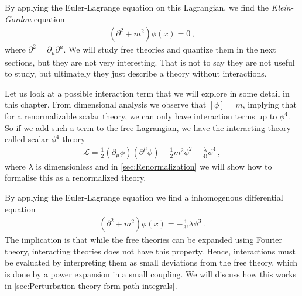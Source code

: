 By applying the Euler-Lagrange equation on this Lagrangian, we find the \emph{Klein-Gordon} equation
\begin{align}
    (\partial^{2}+m^{2})\phi(x)=0\,,
\end{align}  
where $\partial^{2}=\partial_{\mu}\partial^{\mu}$. We will study free theories and quantize them in the next sections, but they are not very interesting. That is not to say they are not useful to study, but ultimately they just describe a theory without interactions.

Let us look at a possible interaction term that we will explore in some detail in this chapter. From dimensional analysis we observe that $[\phi]=m$, implying that for a renormalizable scalar theory, we can only have interaction terms up to $\phi^{4}$. So if we add such a term to the free Lagrangian, we have the interacting theory called scalar $\phi^{4}$-theory
\begin{align}
    \mathcal{L}=\frac{1}{2}(\partial_{\mu}\phi)(\partial^{\mu}\phi)-\frac{1}{2}m^{2}\phi^{2}-\frac{\lambda}{4!}\phi^{4}\,,
\end{align}
where $\lambda$ is dimensionless and in \cref{sec:Renormalization} we will show how to formalise this as a renormalized theory.

By applying the Euler-Lagrange equation we find a inhomogenous differential equation
\begin{align}
    (\partial^{2}+m^{2})\phi(x)=-\frac{1}{3!}\lambda\phi^{3}\,.
\end{align}
The implication is that while the free theories can be expanded using Fourier theory, interacting theories does not have this property. Hence, interactions must be evaluated by interpreting them as small deviations from the free theory, which is done by a power expansion in a small coupling. We will discuss how this works in \cref{sec:Perturbation theory form path integrals}. 

